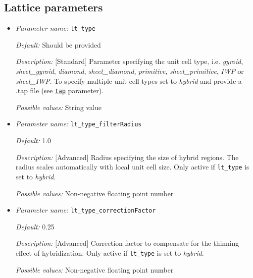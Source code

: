 \subsection{Lattice parameters} \label{parameters:lattice}
\begin{itemize}
	\item {\it Parameter name:} {\tt lt\_type}
	\label{parameters:lt_type}

	
	{\it Default:} Should be provided
	
	{\it Description:} [Standard] Parameter specifying the unit cell type, i.e. {\it gyroid}, {\it sheet\_gyroid}, {\it diamond}, {\it sheet\_diamond}, {\it primitive}, {\it sheet\_primitive}, {\it IWP} or {\it sheet\_IWP}. To specify multiple unit cell types set to {\it hybrid} and provide a .tap file (see \hyperref[parameters:tap]{\tt tap} parameter).
	
	{\it Possible values:} String value
	
	\item {\it Parameter name:} {\tt lt\_type\_filterRadius}
	\label{parameters:lt_type_filterRadius}
	
	
	{\it Default:} 1.0
	
	{\it Description:} [Advanced] Radius specifying the size of hybrid regions. The radius scales automatically with local unit cell size. Only active if {\tt lt\_type} is set to {\it hybrid}.
	
	{\it Possible values:} Non-negative floating point number
	
	\item {\it Parameter name:} {\tt lt\_type\_correctionFactor}
	\label{parameters:lt_type_correctionFactor}
	
	
	{\it Default:} 0.25
	
	{\it Description:} [Advanced] Correction factor to compensate for the thinning effect of hybridization. Only active if {\tt lt\_type} is set to {\it hybrid}.
	
	{\it Possible values:} Non-negative floating point number
	

\end{itemize}
